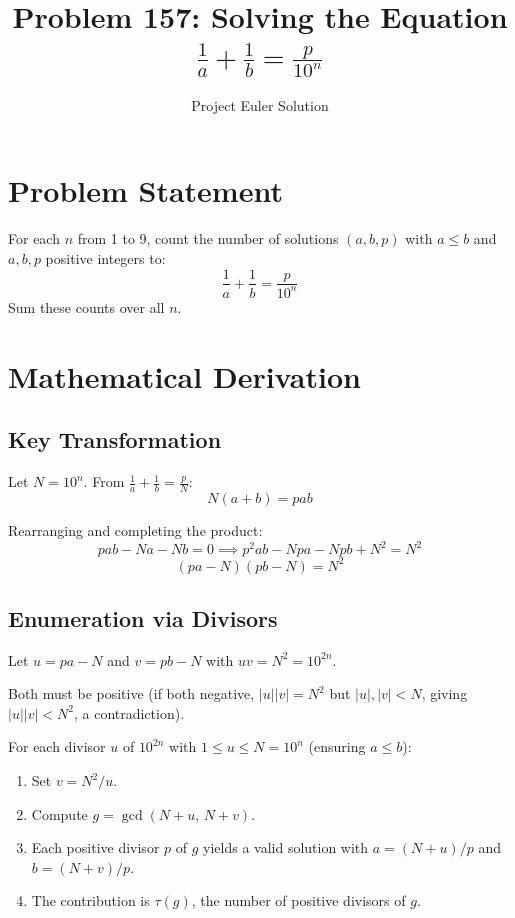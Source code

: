 \documentclass[12pt,a4paper]{article}
\title{Problem 157: Solving the Equation $\frac{1}{a}+\frac{1}{b}=\frac{p}{10^n}$}
\author{Project Euler Solution}
\date{}
\begin{document}
\maketitle

\section{Problem Statement}

For each $n$ from 1 to 9, count the number of solutions $(a, b, p)$ with $a \le b$ and $a, b, p$ positive integers to:
\[
\frac{1}{a} + \frac{1}{b} = \frac{p}{10^n}
\]
Sum these counts over all $n$.

\section{Mathematical Derivation}

\subsection{Key Transformation}

Let $N = 10^n$. From $\frac{1}{a} + \frac{1}{b} = \frac{p}{N}$:
\[
N(a + b) = pab
\]

Rearranging and completing the product:
\[
pab - Na - Nb = 0 \implies p^2ab - Npa - Npb + N^2 = N^2
\]
\[
(pa - N)(pb - N) = N^2
\]

\subsection{Enumeration via Divisors}

Let $u = pa - N$ and $v = pb - N$ with $uv = N^2 = 10^{2n}$.

Both must be positive (if both negative, $|u||v| = N^2$ but $|u|, |v| < N$, giving $|u||v| < N^2$, a contradiction).

For each divisor $u$ of $10^{2n}$ with $1 \le u \le N = 10^n$ (ensuring $a \le b$):
\begin{enumerate}
    \item Set $v = N^2 / u$.
    \item Compute $g = \gcd(N + u,\, N + v)$.
    \item Each positive divisor $p$ of $g$ yields a valid solution with $a = (N+u)/p$ and $b = (N+v)/p$.
    \item The contribution is $\tau(g)$, the number of positive divisors of $g$.
\end{enumerate}
\end{document}
